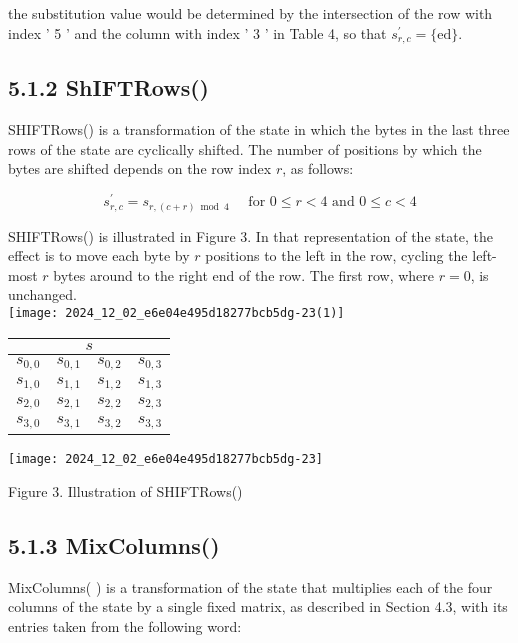 the substitution value would be determined by the intersection of the row with index ' 5 ' and the column with index ' 3 ' in Table 4, so that \(s_{r, c}^{\prime}=\{\mathrm{ed}\}\).

\subsection*{5.1.2 ShIFTRows()}
SHIFTRows() is a transformation of the state in which the bytes in the last three rows of the state are cyclically shifted. The number of positions by which the bytes are shifted depends on the row index \(r\), as follows:

\[
s_{r, c}^{\prime}=s_{r,(c+r) \bmod 4} \quad \text { for } 0 \leq r<4 \text { and } 0 \leq c<4
\]

SHIFTRows() is illustrated in Figure 3. In that representation of the state, the effect is to move each byte by \(r\) positions to the left in the row, cycling the left-most \(r\) bytes around to the right end of the row. The first row, where \(r=0\), is unchanged.\\
\texttt{[image: 2024\_12\_02\_e6e04e495d18277bcb5dg-23(1)]}

\begin{center}
\begin{tabular}{|l|l|l|l|}
\hline
\multicolumn{4}{|c|}{\(s\)} \\
\hline
\(s_{0,0}\) & \(s_{0,1}\) & \(s_{0,2}\) & \(s_{0,3}\) \\
\hline
\(s_{1,0}\) & \(s_{1,1}\) & \(s_{1,2}\) & \(s_{1,3}\) \\
\hline
\(s_{2,0}\) & \(s_{2,1}\) & \(s_{2,2}\) & \(s_{2,3}\) \\
\hline
\(s_{3,0}\) & \(s_{3,1}\) & \(s_{3,2}\) & \(s_{3,3}\) \\
\hline
\end{tabular}
\end{center}

\begin{center}
\texttt{[image: 2024\_12\_02\_e6e04e495d18277bcb5dg-23]}
\end{center}

Figure 3. Illustration of SHIFTRows()

\subsection*{5.1.3 MixColumns()}
MixColumns( ) is a transformation of the state that multiplies each of the four columns of the state by a single fixed matrix, as described in Section 4.3, with its entries taken from the following word:

